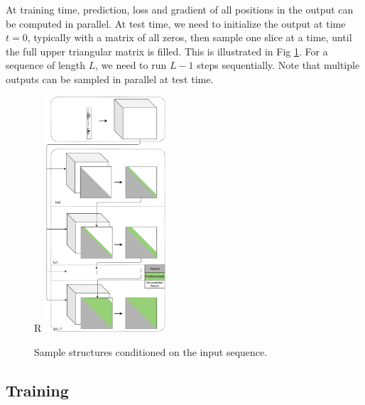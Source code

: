 \documentclass{article}
\begin{document}
At training time, prediction, loss and gradient of all positions in the output can be computed in parallel.
At test time, we need to initialize the output at time $t=0$, typically with a matrix of all zeros,
then sample one slice at a time, until the full upper triangular matrix is filled.
This is illustrated in Fig \ref{fig:nn_arch_2}.
For a sequence of length $L$, we need to run $L-1$ steps sequentially.
Note that multiple outputs can be sampled in parallel at test time.


%

\begin{figure}{R}
        \centering
        \includegraphics[width=0.4\textwidth]{plot/nn_arch_2.pdf}
        \caption{Sample structures conditioned on the input sequence.}
        \label{fig:nn_arch_2}
        \centering
\end{figure}




\subsection{Training}
\end{document}
